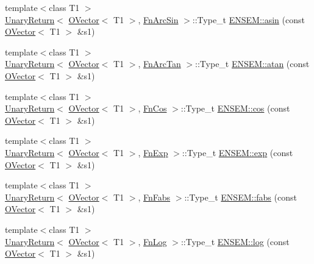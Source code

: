 \begin{DoxyCompactItemize}
\item 
{\footnotesize template$<$class T1 $>$ }\\\mbox{\hyperlink{structENSEM_1_1UnaryReturn}{Unary\+Return}}$<$ \mbox{\hyperlink{classENSEM_1_1OVector}{O\+Vector}}$<$ T1 $>$, \mbox{\hyperlink{structENSEM_1_1FnArcSin}{Fn\+Arc\+Sin}} $>$\+::Type\+\_\+t \mbox{\hyperlink{group__obsvector_ga90cc9607dddfb6dc09c58de601982b10}{E\+N\+S\+E\+M\+::asin}} (const \mbox{\hyperlink{classENSEM_1_1OVector}{O\+Vector}}$<$ T1 $>$ \&s1)
\item 
{\footnotesize template$<$class T1 $>$ }\\\mbox{\hyperlink{structENSEM_1_1UnaryReturn}{Unary\+Return}}$<$ \mbox{\hyperlink{classENSEM_1_1OVector}{O\+Vector}}$<$ T1 $>$, \mbox{\hyperlink{structENSEM_1_1FnArcTan}{Fn\+Arc\+Tan}} $>$\+::Type\+\_\+t \mbox{\hyperlink{group__obsvector_ga1e6e98a68854c39f8ca545ad8dbe328d}{E\+N\+S\+E\+M\+::atan}} (const \mbox{\hyperlink{classENSEM_1_1OVector}{O\+Vector}}$<$ T1 $>$ \&s1)
\item 
{\footnotesize template$<$class T1 $>$ }\\\mbox{\hyperlink{structENSEM_1_1UnaryReturn}{Unary\+Return}}$<$ \mbox{\hyperlink{classENSEM_1_1OVector}{O\+Vector}}$<$ T1 $>$, \mbox{\hyperlink{structENSEM_1_1FnCos}{Fn\+Cos}} $>$\+::Type\+\_\+t \mbox{\hyperlink{group__obsvector_ga723a9a3fcfd45943398e215f7702a7a2}{E\+N\+S\+E\+M\+::cos}} (const \mbox{\hyperlink{classENSEM_1_1OVector}{O\+Vector}}$<$ T1 $>$ \&s1)
\item 
{\footnotesize template$<$class T1 $>$ }\\\mbox{\hyperlink{structENSEM_1_1UnaryReturn}{Unary\+Return}}$<$ \mbox{\hyperlink{classENSEM_1_1OVector}{O\+Vector}}$<$ T1 $>$, \mbox{\hyperlink{structENSEM_1_1FnExp}{Fn\+Exp}} $>$\+::Type\+\_\+t \mbox{\hyperlink{group__obsvector_gaff567614c6353e7b44ea426239a64baf}{E\+N\+S\+E\+M\+::exp}} (const \mbox{\hyperlink{classENSEM_1_1OVector}{O\+Vector}}$<$ T1 $>$ \&s1)
\item 
{\footnotesize template$<$class T1 $>$ }\\\mbox{\hyperlink{structENSEM_1_1UnaryReturn}{Unary\+Return}}$<$ \mbox{\hyperlink{classENSEM_1_1OVector}{O\+Vector}}$<$ T1 $>$, \mbox{\hyperlink{structENSEM_1_1FnFabs}{Fn\+Fabs}} $>$\+::Type\+\_\+t \mbox{\hyperlink{group__obsvector_ga0c007ded942b0d671e46d502b7de7294}{E\+N\+S\+E\+M\+::fabs}} (const \mbox{\hyperlink{classENSEM_1_1OVector}{O\+Vector}}$<$ T1 $>$ \&s1)
\item 
{\footnotesize template$<$class T1 $>$ }\\\mbox{\hyperlink{structENSEM_1_1UnaryReturn}{Unary\+Return}}$<$ \mbox{\hyperlink{classENSEM_1_1OVector}{O\+Vector}}$<$ T1 $>$, \mbox{\hyperlink{structENSEM_1_1FnLog}{Fn\+Log}} $>$\+::Type\+\_\+t \mbox{\hyperlink{group__obsvector_gaed658cf17815056e3f361233ba070ae0}{E\+N\+S\+E\+M\+::log}} (const \mbox{\hyperlink{classENSEM_1_1OVector}{O\+Vector}}$<$ T1 $>$ \&s1)

\end{DoxyCompactItemize}
